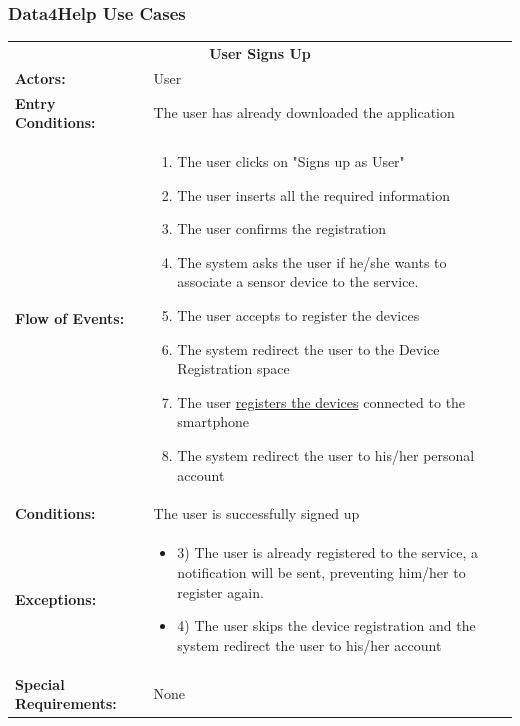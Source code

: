 {\color{Blue}\subsubsection{Data4Help Use Cases}}
\begin{table}[htb]
	\centering
	{\renewcommand{\arraystretch}{2}%
		\begin{tabular}{|@{\hspace{2em}} p{4cm} @{}| p{11cm} @{\qquad}| }
			\cline{1-2}
			\multicolumn{2}{|c|}{\textbf{User Signs Up}} \\ \cline{1-2}
			\textbf{Actors:} & User \\ \cline{1-2}
			\textbf{Entry Conditions:} & The user has already downloaded the application \\ \cline{1-2}
			\textbf{Flow of Events:} & 
			\begin{enumerate}[itemsep=-0.2em, topsep=0em]
				\item The user clicks on "Signs up as User"
				\item The user inserts all the required information
				\item The user confirms the registration
				\item The system asks the user if he/she wants to 
				associate a sensor device to the service.
				\item The user accepts to register the devices
				\item The system redirect the user to the Device Registration space
				\item The user \underline{registers the devices} connected to the smartphone
				\item The system redirect the user to his/her personal account
			\end{enumerate}\\ \cline{1-2}
			\textbf{ Conditions:} & The user is successfully signed up\\ \cline{1-2}
			\textbf{Exceptions:} & 
			\begin{itemize}[itemsep=-0.2em, topsep=0em]
				\item 3) The user is already registered to the service, a notification will be sent, preventing him/her to register again.
				\item 4) The user skips the device registration and the system redirect the user to his/her account
			\end{itemize} \\ \cline{1-2}
			\small{\textbf{Special Requirements:}} & None \\ \hline
	\end{tabular}} \quad
\end{table}

